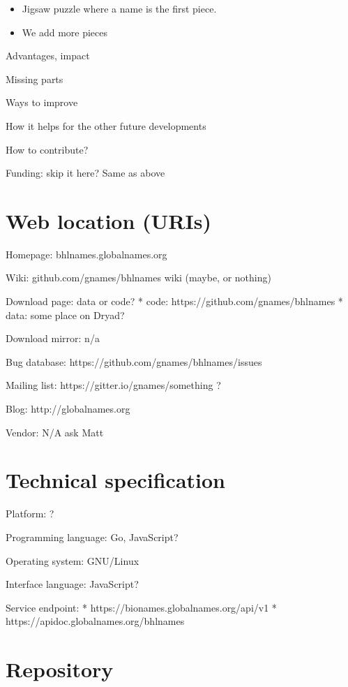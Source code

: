 \documentclass[
]{article}
\providecommand{\tightlist}{%
  \setlength{\itemsep}{0pt}\setlength{\parskip}{0pt}}
\begin{document}
\begin{itemize}
\tightlist
\item
  Jigsaw puzzle where a name is the first piece.
\item
  We add more pieces
\end{itemize}

Advantages, impact

Missing parts

Ways to improve

How it helps for the other future developments

How to contribute?

Funding: skip it here? Same as above

\hypertarget{web-location-uris}{%
\section{Web location (URIs)}\label{web-location-uris}}

Homepage: bhlnames.globalnames.org

Wiki: github.com/gnames/bhlnames wiki (maybe, or nothing)

Download page: data or code? * code: https://github.com/gnames/bhlnames
* data: some place on Dryad?

Download mirror: n/a

Bug database: https://github.com/gnames/bhlnames/issues

Mailing list: https://gitter.io/gnames/something ?

Blog: http://globalnames.org

Vendor: N/A ask Matt

\hypertarget{technical-specification}{%
\section{Technical specification}\label{technical-specification}}

Platform: ?

Programming language: Go, JavaScript?

Operating system: GNU/Linux

Interface language: JavaScript?

Service endpoint: * https://bionames.globalnames.org/api/v1 *
https://apidoc.globalnames.org/bhlnames

\hypertarget{repository}{%
\section{Repository}\label{repository}}
\end{document}
